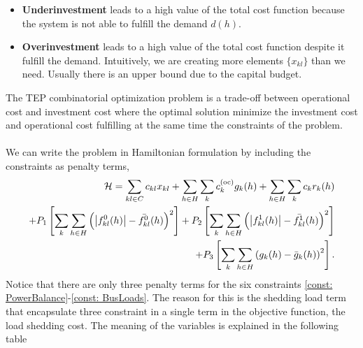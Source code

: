 \begin{itemize}
    \item \textbf{Underinvestment} leads to a high value of the total cost function because the system is not able to fulfill the demand $d(h)$.
    \item \textbf{Overinvestment} leads to a high value of the total cost function despite it fulfill the demand. Intuitively, we are creating more elements $\{x_{kl}\}$ than we need. Usually there is an upper bound due to the capital budget.
\end{itemize}
The TEP combinatorial optimization problem is a trade-off between operational cost and investment cost where the optimal solution minimize the investment cost and operational cost fulfilling at the same time the constraints of the problem.\\\\
We can write the problem in Hamiltonian formulation by including the constraints as penalty terms,
\begin{align}
    \mathcal{H} = \sum_{kl\in C}c_{kl}x_{kl} + \sum_{h \in H}\sum_{k}c_{k}^{(\text{oc})}g_{k}(h)+ \sum_{h \in H}\sum_{k}c_{k}r_{k}(h)\\
    + P_{1}\left[\sum_{k}\sum_{h\in H}\left(\abs{f_{kl}^{0}(h)} - \bar{f_{kl}^{0}}(h)   \right)^{2}\right] +
    P_{2}\left[\sum_{k}\sum_{h\in H}\left(\abs{f_{kl}^{1}(h)} - \bar{f_{kl}^{1}}(h)\right)^{2}\right]\\
    + P_{3}\left[\sum_{k}\sum_{h\in H}\left(g_{k}(h)-\bar{g}_{k}(h)\right)^{2}\right].
\end{align}
Notice that there are only three penalty terms for the six constraints \eqref{const: PowerBalance}-\eqref{const: BusLoads}. The reason for this is the shedding load term that encapsulate three constraint in a single term in the objective function, the load shedding cost.
The meaning of the variables is explained in the following table
